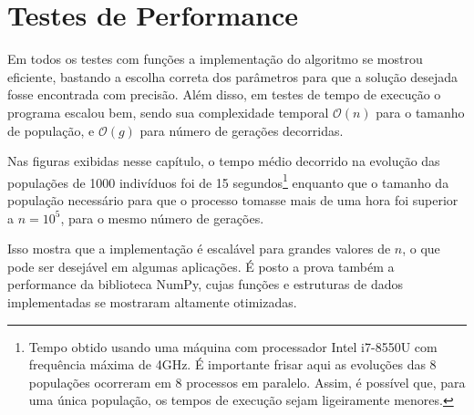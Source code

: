 \section{Testes de Performance}

Em todos os testes com funções a implementação do algoritmo se mostrou eficiente, bastando a escolha 
correta dos parâmetros para que a solução desejada fosse encontrada com precisão. Além disso, em testes
de tempo de execução o programa escalou bem, sendo sua complexidade temporal $\mathcal{O}(n)$ para o
tamanho de população, e $\mathcal{O}(g)$ para número de gerações decorridas. 

Nas figuras exibidas nesse capítulo, o tempo médio decorrido na evolução das populações de 1000 indivíduos
foi de 15 segundos\footnote{
  Tempo obtido usando uma máquina com processador Intel i7-8550U com frequência máxima de 4GHz.
  É importante frisar aqui as evoluções das 8 populações ocorreram em 8 processos em paralelo.
  Assim, é possível que, para uma única população, os tempos de execução sejam ligeiramente menores.
} enquanto que o tamanho da população necessário para que o processo tomasse mais de uma hora foi
superior a $n = 10^5$, para o mesmo número de gerações.

Isso mostra que a implementação é escalável para grandes valores de $n$, o que pode ser desejável em
algumas aplicações. É posto a prova também a performance da biblioteca NumPy, cujas funções e estruturas
de dados implementadas se mostraram altamente otimizadas.